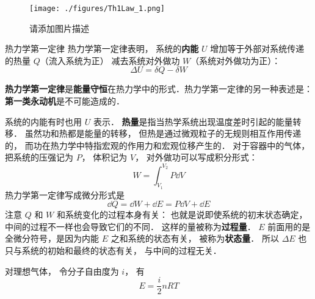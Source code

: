 
\begin{issues}
\issueDraft
\end{issues}

\begin{figure}[ht]
\centering
\texttt{[image: ./figures/Th1Law\_1.png]}
\caption{请添加图片描述} \label{Th1Law_fig1}
\end{figure}
\begin{theorem}{热力学第一定律}
热力学第一定律表明， 系统的\textbf{内能} $U$ 增加等于外部对系统传递的热量 $Q$（流入系统为正） 减去系统对外做功 $W$（系统对外做功为正）：
\begin{equation}\label{Th1Law_eq1}
\Delta U = \delta Q - \delta W
\end{equation}
\end{theorem}

\textbf{热力学第一定律}是\textbf{能量守恒}在热力学中的形式．热力学第一定律的另一种表述是：\textbf{第一类永动机}是不可能造成的．

系统的内能有时也用 $U$ 表示． 
 \textbf{热量}是指当热学系统出现温度差时引起的能量转移． 
虽然功和热都是能量的转移， 但热是通过微观粒子的无规则相互作用传递的， 而功在热力学中特指宏观的作用力和宏观位移产生的． 对于容器中的气体， 把系统的压强记为 $P$， 体积记为 $V$， 对外做功可以写成积分形式：
\begin{equation}
W = \int_{V_1}^{V_2} P \dd{V}
\end{equation}
热力学第一定律写成微分形式是
\begin{equation}\label{Th1Law_eq2}
\dd Q = \dd W + \dd E = P\dd V + \dd E
\end{equation}
注意 $Q$ 和 $W$ 和系统变化的过程本身有关： 也就是说即使系统的初末状态确定， 中间的过程不一样也会导致它们的不同． 这样的量被称为\textbf{过程量}． $E$ 前面用的是全微分符号，是因为内能 $E$ 之和系统的状态有关， 被称为\textbf{状态量}． 所以 $\Delta E$ 也只与系统的初始和最终的状态有关， 与中间的过程无关．



对理想气体， 令分子自由度为 $i$， 有
\begin{equation}
E = \frac{i}{2}n RT
\end{equation}
